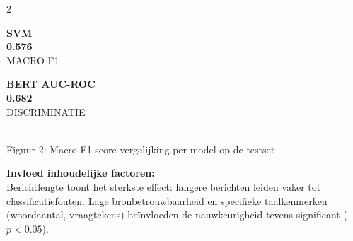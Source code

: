 \documentclass[a0,portrait]{hogent-poster}
\begin{document}
\begin{multicols}{2}
\vspace{16pt}
\noindent
\begin{minipage}{0.48\linewidth}
    \begin{resultcard}
        \vspace{10pt}
        \Large\textbf{\textcolor{html-gray-text}{SVM}}\\[5pt]
        \Huge\textbf{0.576}\\[5pt]
        \normalsize \textcolor{html-gray-text}{MACRO F1}
        \vspace{10pt}
    \end{resultcard}
\end{minipage}\hfill
\begin{minipage}{0.48\linewidth}
    \begin{resultcard}
        \vspace{10pt}
        \Large\textbf{\textcolor{html-gray-text}{BERT AUC-ROC}}\\[5pt]
        \Huge\textbf{0.682}\\[5pt]
        \normalsize \textcolor{html-gray-text}{DISCRIMINATIE}
        \vspace{10pt}
    \end{resultcard}
\end{minipage}

\vspace{1.5cm}
\begin{center}
\vspace{10pt}
\\
\footnotesize \textcolor{html-gray-text}{Figuur 2: Macro F1-score vergelijking per model op de testset}
\end{center}

\vspace{16pt}
\textbf{Invloed inhoudelijke factoren:}\\
Berichtlengte toont het sterkste effect: langere berichten leiden vaker tot classificatiefouten. Lage bronbetrouwbaarheid en specifieke taalkenmerken (woordaantal, vraagtekens) beïnvloeden de nauwkeurigheid tevens significant ($p<0.05$).



\end{multicols}
\end{document}
